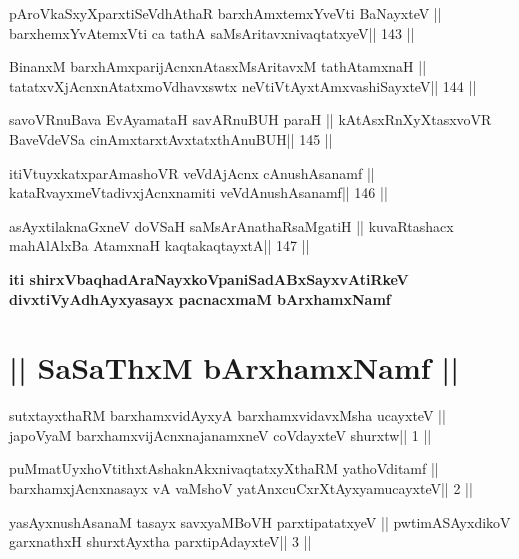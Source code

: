 \begin{shl}
pAroVkaSxyXparxtiSeVdhAthaR barxhAmx\s\s temxYveVti BaNayxteV ||
barxhemxYvA\s\s temxVti ca tathA saMsAritavxnivaqtatxyeV\hfill || 143 ||
\end{shl}

\begin{shl}
BinanxM barxhAmxparijAcnxnAtasxMsAritavxM tathA\s\s tamxnaH ||
tatatxvXjAcnxnAtatxmoVdhavxswtx neVtiVtAyxtAmx\s vashiSayxteV\hfill || 144 ||
\end{shl}

\begin{shl}
savoVR\s nuBava EvAyamataH savARnuBUH paraH ||
kAtAsxRnXyXtasxvoVR BaveVdeVSa cinAmxtarxtAvxtatxthA\s nuBUH\hfill || 145 ||
\end{shl}

\begin{shl}
itiVtuyxkatxparAmashoVR veVdAjAcnx cAnushAsanamf ||
kataRvayxmeVtadivxjAcnxnamiti veVdAnushAsanamf\hfill || 146 ||
\end{shl}

\begin{shl}
asAyxtilaknaGxneV doVSaH saMsArAnathaRsaMgatiH ||
kuvaRtashacx mahAlAlxBa AtamxnaH kaqtakaqtayxtA\hfill || 147 ||
\end{shl}

\begin{center}
{\bf iti shirxVbaqhadAraNayxkoVpaniSadABxSayxvAtiRkeV\\ 
divxtiVyAdhAyxyasayx pacnacxmaM bArxhamxNamf}
\end{center}

\section{|| SaSaThxM bArxhamxNamf ||}

\begin{shl}
sutxtayxthaRM barxhamxvidAyxyA barxhamxvidavxMsha ucayxteV ||
japoV\s yaM barxhamxvijAcnxnajanamxneV coVdayxteV shurxtw\hfill || 1 ||
\end{shl}

\begin{shl}
puMmatUyxhoVtithxtAshaknAkxnivaqtatxyXthaRM yathoVditamf ||
barxhamxjAcnxnasayx vA vaMshoV yatAnxcuCxrXtAyx\s yamucayxteV\hfill || 2 ||
\end{shl}

\begin{shl}
yasAyxnushAsanaM tasayx savxyaMBoVH parxtipatatxyeV ||
pwtimASAyxdikoV garxnathxH shurxtAyx\s tha parxtipAdayxteV\hfill || 3 ||
\end{shl}

